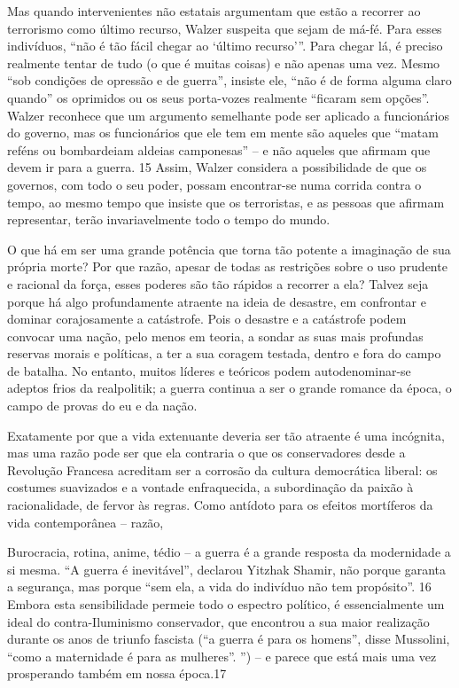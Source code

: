 Mas quando intervenientes não estatais argumentam que estão a recorrer ao terrorismo como último recurso, Walzer suspeita que sejam de má-fé. Para esses indivíduos, “não é tão fácil chegar ao ‘último recurso’”. Para chegar lá, é preciso realmente tentar de tudo (o que é muitas coisas) e não apenas uma vez. Mesmo “sob condições de opressão e de guerra”, insiste ele, “não é de forma alguma claro quando” os oprimidos ou os seus porta-vozes realmente “ficaram sem opções”. Walzer reconhece que um argumento semelhante pode ser aplicado a funcionários do governo, mas os funcionários que ele tem em mente são aqueles que “matam reféns ou bombardeiam aldeias camponesas” – e não aqueles que afirmam que devem ir para a guerra. {\color{blue}15} Assim, Walzer considera a possibilidade de que os governos, com todo o seu poder, possam encontrar-se numa corrida contra o tempo, ao mesmo tempo que insiste que os terroristas, e as pessoas que afirmam representar, terão invariavelmente todo o tempo do mundo.
 \par 
O que há em ser uma grande potência que torna tão potente a imaginação de sua própria morte? Por que razão, apesar de todas as restrições sobre o uso prudente e racional da força, esses poderes são tão rápidos a recorrer a ela? Talvez seja porque há algo profundamente atraente na ideia de desastre, em confrontar e dominar corajosamente a catástrofe. Pois o desastre e a catástrofe podem convocar uma nação, pelo menos em teoria, a sondar as suas mais profundas reservas morais e políticas, a ter a sua coragem testada, dentro e fora do campo de batalha. No entanto, muitos líderes e teóricos podem autodenominar-se adeptos frios da realpolitik; a guerra continua a ser o grande romance da época, o campo de provas do eu e da nação.
 \par 
Exatamente por que a vida extenuante deveria ser tão atraente é uma incógnita, mas uma razão pode ser que ela contraria o que os conservadores desde a Revolução Francesa acreditam ser a corrosão da cultura democrática liberal: os costumes suavizados e a vontade enfraquecida, a subordinação da paixão à racionalidade, de fervor às regras. Como antídoto para os efeitos mortíferos da vida contemporânea – razão,
 \par 
Burocracia, rotina, anime, tédio – a guerra é a grande resposta da modernidade a si mesma. “A guerra é inevitável”, declarou Yitzhak Shamir, não porque garanta a segurança, mas porque “sem ela, a vida do indivíduo não tem propósito”. {\color{blue}16} Embora esta sensibilidade permeie todo o espectro político, é essencialmente um ideal do contra-Iluminismo conservador, que encontrou a sua maior realização durante os anos de triunfo fascista (“a guerra é para os homens”, disse Mussolini, “como a maternidade é para as mulheres”. ”) – e parece que está mais uma vez prosperando também em nossa época.{\color{blue}17}
